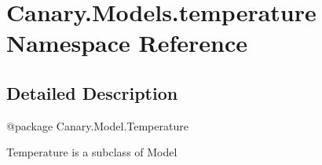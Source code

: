 \hypertarget{namespace_canary_1_1_models_1_1temperature}{\section{Canary.\-Models.\-temperature Namespace Reference}
\label{namespace_canary_1_1_models_1_1temperature}
}


\subsection{Detailed Description}
\begin{DoxyVerb}@package Canary.Model.Temperature

Temperature is a subclass of Model
\end{DoxyVerb}
 